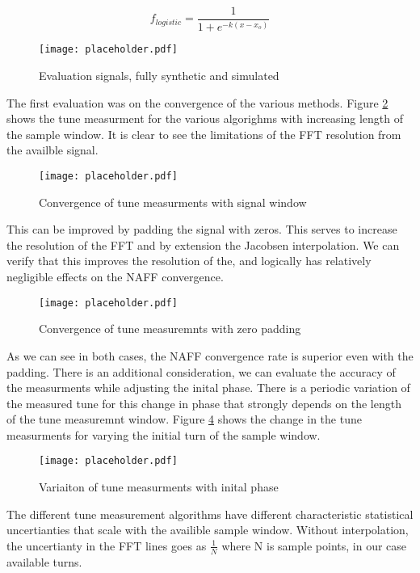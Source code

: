 \begin{equation}
	f_{logistic} = \frac{1}{1 + e^{-k(x-x_o)}}
	\label{eq:logistic}
\end{equation}

\begin{figure}
	\centering
	\texttt{[image: placeholder.pdf]}
	\caption{Evaluation signals, fully synthetic and simulated}
	\label{fig:synTune}
\end{figure}

The first evaluation was on the convergence of the various methods. Figure \ref{fig:baseConv} shows the tune measurment for the various algorighms with increasing length of the sample window. It is clear to see the limitations of the FFT resolution from the availble signal. 

\begin{figure}
	\centering
	\texttt{[image: placeholder.pdf]}
	\caption{Convergence of tune measurments with signal window}
	\label{fig:baseConv}
\end{figure}

This can be improved by padding the signal with zeros. This serves to increase the resolution of the FFT and by extension the Jacobsen interpolation. We can verify that this improves the resolution of the, and logically has relatively negligible effects on the NAFF convergence.

\begin{figure}
	\centering
	\texttt{[image: placeholder.pdf]}
	\caption{Convergence of tune measuremnts with zero padding}
	\label{fig:padConv}
\end{figure}

As we can see in both cases, the NAFF convergence rate is superior even with the padding. There is an additional consideration, we can evaluate the accuracy of the measurments while adjusting the inital phase. There is a periodic variation of the measured tune for this change in phase that strongly depends on the length of the tune measuremnt window. Figure \ref{fig:baseRoll} shows the change in the tune measurments for varying the initial turn of the sample window. 

\begin{figure}
	\centering
	\texttt{[image: placeholder.pdf]}
	\caption{Variaiton of tune measurments with inital phase}
	\label{fig:baseRoll}
\end{figure}

The different tune measurement algorithms have different characteristic statistical uncertianties that scale with the availible sample window. Without interpolation, the uncertianty in the FFT lines goes as $\frac{1}{N}$ where N is sample points, in our case available turns.

